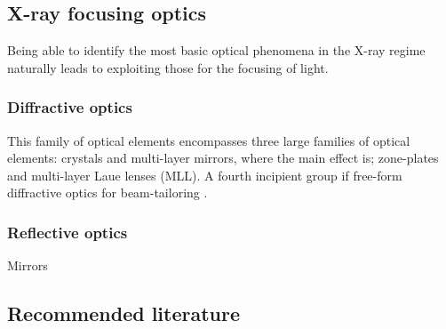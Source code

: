 \begin{refsection}
\subsection{X-ray focusing optics}

Being able to identify the most basic optical phenomena in the X-ray regime naturally leads to exploiting those for the focusing of light.

\subsubsection*{Diffractive optics}

This family of optical elements encompasses three large families of optical elements: crystals and multi-layer mirrors, where the main effect is; zone-plates and multi-layer Laue lenses (MLL). A fourth incipient group if free-form diffractive optics for beam-tailoring . 

\subsubsection*{Reflective optics}\label{sec:reflec}
Mirrors 

\subsection*{Recommended literature}


\end{refsection}
